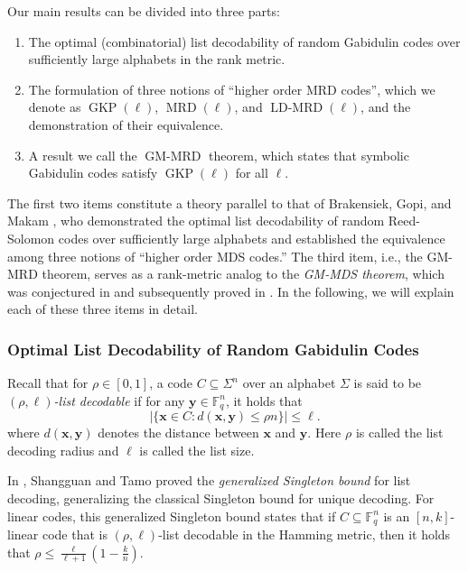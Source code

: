 \documentclass[11pt]{article}
\theoremstyle{plain}
\theoremstyle{definition}
\theoremstyle{remark}
\newcommand{\F}{\mathbb{F}}
\newcommand{\by}{\bm{y}}
\newcommand{\bx}{\bm{x}}
\begin{document}
Our main results can be divided into three parts:
\begin{enumerate}
    \item The optimal (combinatorial) list decodability of random Gabidulin codes over sufficiently large alphabets in the rank metric.
    \item The formulation of three notions of ``higher order MRD codes'', which we denote as $\operatorname{GKP}(\ell)$, $\operatorname{MRD}(\ell)$, and $\operatorname{LD-MRD}(\ell)$, and the demonstration of their equivalence.
    \item A result we call the $\operatorname{GM-MRD}$ theorem, which states that symbolic Gabidulin codes satisfy $\operatorname{GKP}(\ell)$ for all $\ell$.
\end{enumerate} 

The first two items constitute a theory parallel to that of Brakensiek, Gopi, and Makam \cite{brakensiek2023generic}, who demonstrated the optimal list decodability of random Reed-Solomon codes over sufficiently large alphabets and established the equivalence among three notions of ``higher order MDS codes.'' The third item, i.e., the GM-MRD theorem, serves as a rank-metric analog to the \emph{GM-MDS theorem}, which was conjectured in \cite{dau2014existence} and subsequently proved in \cite{lovett2018mds,yildiz2019optimum}.
In the following, we will explain each of these three items in detail.

\subsubsection{Optimal List Decodability of Random Gabidulin Codes} 

Recall that for $\rho\in [0,1]$, a code $C\subseteq\Sigma^n$ over an alphabet $\Sigma$  is said to be \emph{$(\rho,\ell)$-list decodable} if for any $\by\in\F_q^n$, it holds that 
\[
|\{\bx\in C: d(\bx,\by)\leq \rho n\}|\leq \ell.
\]
where $d(\bx,\by)$ denotes the distance between $\bx$ and $\by$. Here $\rho$ is called the list decoding radius and $\ell$ is called the list size.

In \cite{shangguan2020combinatorial}, Shangguan and Tamo proved the \emph{generalized Singleton bound} for list decoding, generalizing the classical Singleton bound for unique decoding. For linear codes, this generalized Singleton bound states that 
if $C\subseteq\F_q^n$ is an $[n,k]$-linear code that is $(\rho,\ell)$-list decodable in the Hamming metric, then it holds that $\rho\leq \frac{\ell}{\ell+1}\left(1-\frac{k}{n}\right)$.
\end{document}

